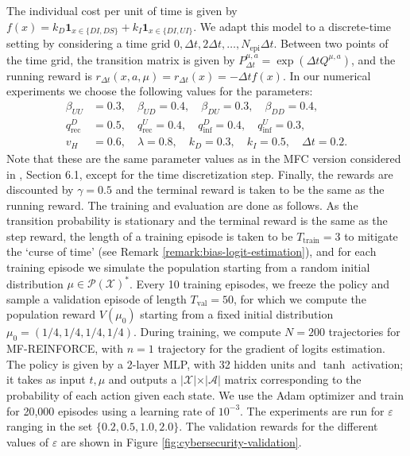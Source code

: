 \documentclass[11pt]{article}
\numberwithin{equation}{section}
\theoremstyle{definition}
\theoremstyle{remark}
\def\eps{\varepsilon}
\def\cA{\mathcal{A}}
\def\cX{\mathcal{X}}
\begin{document}
The individual cost per unit of time is given by $f(x) = k_D \mathbf 1_{x \in \{DI,DS\}} + k_I \mathbf 1_{ x \in \{DI, UI\}}$.
We adapt this model to a discrete-time setting by considering a time grid $0, \Delta t, 2 \Delta t, \ldots, N_{\mathrm{epi}} \Delta t$. Between two points of the time grid, the transition matrix is given by $P^{\mu, a}_{\Delta t} = \exp(\Delta t Q^{\mu, a})$, and the running reward is $r_{\Delta t}(x,a,\mu) = r_{\Delta t}(x) = - \Delta t f(x)$.
In our numerical experiments we choose the following values for the parameters:
\[
\begin{aligned}
\beta_{U U}&=0.3, \quad  \beta_{U D}=0.4, \quad \beta_{D U}=0.3, \quad \beta_{D D}=0.4, \\
q_{\mathrm{rec}}^D&=0.5, \quad  q_{\mathrm{rec}}^U=0.4, \quad q_{\mathrm{inf}}^D=0.4, \quad q_{\mathrm{inf}}^U=0.3, \\
v_H&=0.6, \quad \lambda=0.8, \quad k_D=0.3, \quad k_I=0.5, \quad \Delta t = 0.2.
\end{aligned}
\]
Note that these are the same parameter values as in the MFC version considered in \cite{carmona2023model}, Section 6.1, except for the time discretization step. Finally, the rewards are discounted by $\gamma = 0.5$ and the terminal reward is taken to be the same as the running reward. The training and evaluation are done as follows.
As the transition probability is stationary and the terminal reward is the same as the step reward, the length of a training episode is taken to be $T_{\mathrm{train}} = 3$ to mitigate the `curse of time' (see Remark \ref{remark:bias-logit-estimation}), and for each training episode we simulate the population starting from a random initial distribution $\mu\in \mathcal P (\cX)^*$. 
Every 10 training episodes, we freeze the policy and sample a validation episode of length $T_{\mathrm{val}} = 50$, for which we compute the population reward $V(\mu_0)$ starting from a fixed initial distribution $\mu_0 = (1/4,1/4,1/4,1/4)$.
During training, we compute $N = 200$ trajectories for MF-REINFORCE, with $n = 1$ trajectory for the gradient of logits estimation. 
The policy is given by a 2-layer MLP, with 32 hidden units and $\tanh$ activation; it takes as input $t, \mu$ and outputs a $\mathcal |\cX| \times |\cA|$ matrix corresponding to the probability of each action given each state.
We use the Adam optimizer and train for 20,000 episodes using a learning rate of $10^{-3}$. 
The experiments are run for $\eps$ ranging in the set $\{0.2, 0.5, 1.0, 2.0\}$. 
The validation rewards for the different values of $\eps$ are shown in Figure \ref{fig:cybersecurity-validation}.
\end{document}
